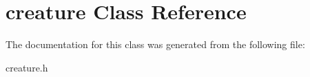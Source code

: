 \hypertarget{classcreature}{}\section{creature Class Reference}
\label{classcreature}


The documentation for this class was generated from the following file\+:\begin{DoxyCompactItemize}
\item 
creature.\+h\end{DoxyCompactItemize}
